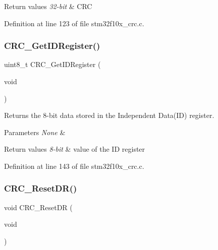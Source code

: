 \begin{DoxyRetVals}{Return values}
{\em 32-\/bit} & C\+RC \\
\hline
\end{DoxyRetVals}


Definition at line 123 of file stm32f10x\+\_\+crc.\+c.

\mbox{\label{group___c_r_c___private___functions_gaf869f6e9c3ca0ae0822cfad1abea7e5f}} 
\subsubsection{\texorpdfstring{C\+R\+C\+\_\+\+Get\+I\+D\+Register()}{CRC\_GetIDRegister()}}
{\footnotesize\ttfamily uint8\+\_\+t C\+R\+C\+\_\+\+Get\+I\+D\+Register (\begin{DoxyParamCaption}\item[{void}]{ }\end{DoxyParamCaption})}



Returns the 8-\/bit data stored in the Independent Data(\+I\+D) register. 


\begin{DoxyParams}{Parameters}
{\em None} & \\
\hline
\end{DoxyParams}

\begin{DoxyRetVals}{Return values}
{\em 8-\/bit} & value of the ID register \\
\hline
\end{DoxyRetVals}


Definition at line 143 of file stm32f10x\+\_\+crc.\+c.

\mbox{\label{group___c_r_c___private___functions_ga506467d5ef873a5a4ade4ae83cb110f6}} 
\subsubsection{\texorpdfstring{C\+R\+C\+\_\+\+Reset\+D\+R()}{CRC\_ResetDR()}}
{\footnotesize\ttfamily void C\+R\+C\+\_\+\+Reset\+DR (\begin{DoxyParamCaption}\item[{void}]{ }\end{DoxyParamCaption})}



